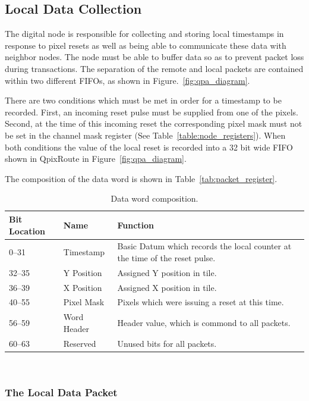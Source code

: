 \subsection{Local Data Collection}

The digital node is responsible for collecting and storing local timestamps in response to pixel resets as well as being able to communicate these data with neighbor nodes.
The node must be able to buffer data so as to prevent packet loss during transactions.
The separation of the remote and local packets are contained within two different FIFOs, as shown in Figure.~\ref{fig:qpa_diagram}.

There are two conditions which must be met in order for a timestamp to be recorded.
First, an incoming reset pulse must be supplied from one of the pixels.
Second, at the time of this incoming reset the corresponding pixel mask must not be set in the channel mask register (See Table~\ref{table:node_registers}).
When both conditions the value of the local reset is recorded into a 32 bit wide FIFO shown in QpixRoute in Figure~\ref{fig:qpa_diagram}.

The composition of the data word is shown in Table~\ref{tab:packet_register}.
\begin{table}
\begin{center}
\begin{tabular}{|| p{30mm} | p{30mm} | p{90mm} ||}
 \hline
 Bit Location & Name & Function \\ [0.5ex]
 \hline\hline
  0--31 & Timestamp & Basic Datum which records the local counter at the time of the reset pulse. \\
 \hline
  32--35 & Y Position & Assigned Y position in tile. \\
 \hline
  36--39 & X Position & Assigned X position in tile. \\
 \hline
  40--55 & Pixel Mask & Pixels which were issuing a reset at this time. \\
 \hline
  56--59 & Word Header & Header value, which is commond to all packets. \\
 \hline
  60--63 & Reserved & Unused bits for all packets. \\
 \hline
\end{tabular}
\caption{Data word composition.}
\end{center}
\end{table}
~\label{tab:packet_data}

\subsubsection{The Local Data Packet}~\label{sec:local_data_packet}

